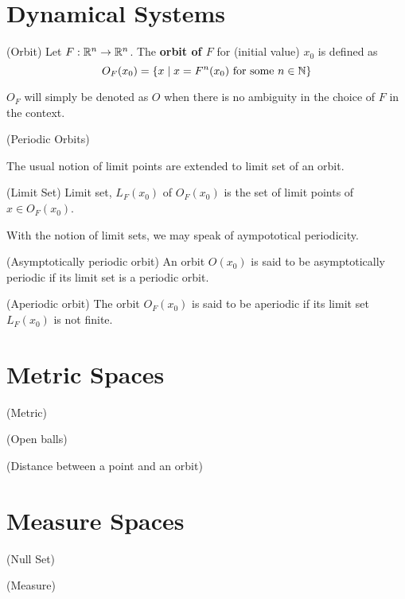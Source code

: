 \documentclass[11pt]{article}
\begin{document}
\section{Dynamical Systems}
\begin{definition}
  (Orbit)
  Let $F: \mathbb{R}^n \to \mathbb{R}^n$. 
  The \textbf{orbit of $F$} for (initial value) $x_0$ is defined as
  \begin{equation*}
    O_F(x_0) = \{x \; | \; x = F^n(x_0) \mbox{ for some } n\in \mathbb{N}\}
  \end{equation*}
  \label{def:orbit}
\end{definition}
$O_F$ will simply be denoted as $O$ when there is no ambiguity in the choice of $F$ in the context.

\begin{definition}
  (Periodic Orbits)
  \label{def:porbit}
\end{definition}

The usual notion of limit points are extended to limit set of an orbit.
\begin{definition}
  (Limit Set)
  Limit set, $L_F(x_0)$ of $O_F(x_0)$ is the set of limit points of $x \in O_F(x_0)$.
  \label{def:limset}
\end{definition}

With the notion of limit sets, we may speak of aympototical periodicity.
\begin{definition}
  (Asymptotically periodic orbit)
  An orbit $O(x_0)$ is said to be asymptotically periodic if its limit set is a periodic orbit.
  \label{def:asymporb}
\end{definition}

\begin{definition}
  (Aperiodic orbit)
  The orbit $O_F(x_0)$ is said to be aperiodic if its limit set $L_F(x_0)$ is not finite.
  \label{def:aporbit}
\end{definition}


\section{Metric Spaces}
\begin{definition}
  (Metric)
\end{definition}
\begin{definition}
  (Open balls)
\end{definition}
\begin{definition}
  (Distance between a point and an orbit)
\end{definition}

\section{Measure Spaces}
\begin{definition}
  (Null Set)
\end{definition}
\begin{definition}
  (Measure)
\end{definition}
\end{document}
